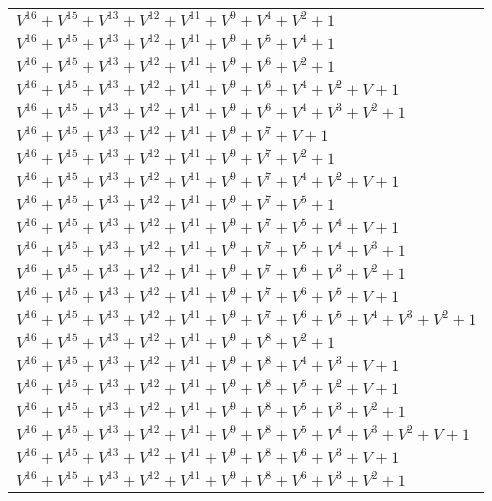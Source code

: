 \documentclass[12pt]{article}
\begin{document}
\begin{adjustwidth}{-4cm}{}
\begin{center}
\begin{longtable}{|l|}
$V^{16}  +V^{15}  +V^{13}  +V^{12}  +V^{11}  +V^{9}  +V^{4}  +V^{2}  + 1$ \\
$V^{16}  +V^{15}  +V^{13}  +V^{12}  +V^{11}  +V^{9}  +V^{5}  +V^{4}  + 1$ \\
$V^{16}  +V^{15}  +V^{13}  +V^{12}  +V^{11}  +V^{9}  +V^{6}  +V^{2}  + 1$ \\
$V^{16}  +V^{15}  +V^{13}  +V^{12}  +V^{11}  +V^{9}  +V^{6}  +V^{4}  +V^{2}  + V + 1$ \\
$V^{16}  +V^{15}  +V^{13}  +V^{12}  +V^{11}  +V^{9}  +V^{6}  +V^{4}  +V^{3}  +V^{2}  + 1$ \\
$V^{16}  +V^{15}  +V^{13}  +V^{12}  +V^{11}  +V^{9}  +V^{7}  + V + 1$ \\
$V^{16}  +V^{15}  +V^{13}  +V^{12}  +V^{11}  +V^{9}  +V^{7}  +V^{2}  + 1$ \\
$V^{16}  +V^{15}  +V^{13}  +V^{12}  +V^{11}  +V^{9}  +V^{7}  +V^{4}  +V^{2}  + V + 1$ \\
$V^{16}  +V^{15}  +V^{13}  +V^{12}  +V^{11}  +V^{9}  +V^{7}  +V^{5}  + 1$ \\
$V^{16}  +V^{15}  +V^{13}  +V^{12}  +V^{11}  +V^{9}  +V^{7}  +V^{5}  +V^{4}  + V + 1$ \\
$V^{16}  +V^{15}  +V^{13}  +V^{12}  +V^{11}  +V^{9}  +V^{7}  +V^{5}  +V^{4}  +V^{3}  + 1$ \\
$V^{16}  +V^{15}  +V^{13}  +V^{12}  +V^{11}  +V^{9}  +V^{7}  +V^{6}  +V^{3}  +V^{2}  + 1$ \\
$V^{16}  +V^{15}  +V^{13}  +V^{12}  +V^{11}  +V^{9}  +V^{7}  +V^{6}  +V^{5}  + V + 1$ \\
$V^{16}  +V^{15}  +V^{13}  +V^{12}  +V^{11}  +V^{9}  +V^{7}  +V^{6}  +V^{5}  +V^{4}  +V^{3}  +V^{2}  + 1$ \\
$V^{16}  +V^{15}  +V^{13}  +V^{12}  +V^{11}  +V^{9}  +V^{8}  +V^{2}  + 1$ \\
$V^{16}  +V^{15}  +V^{13}  +V^{12}  +V^{11}  +V^{9}  +V^{8}  +V^{4}  +V^{3}  + V + 1$ \\
$V^{16}  +V^{15}  +V^{13}  +V^{12}  +V^{11}  +V^{9}  +V^{8}  +V^{5}  +V^{2}  + V + 1$ \\
$V^{16}  +V^{15}  +V^{13}  +V^{12}  +V^{11}  +V^{9}  +V^{8}  +V^{5}  +V^{3}  +V^{2}  + 1$ \\
$V^{16}  +V^{15}  +V^{13}  +V^{12}  +V^{11}  +V^{9}  +V^{8}  +V^{5}  +V^{4}  +V^{3}  +V^{2}  + V + 1$ \\
$V^{16}  +V^{15}  +V^{13}  +V^{12}  +V^{11}  +V^{9}  +V^{8}  +V^{6}  +V^{3}  + V + 1$ \\
$V^{16}  +V^{15}  +V^{13}  +V^{12}  +V^{11}  +V^{9}  +V^{8}  +V^{6}  +V^{3}  +V^{2}  + 1$ \\

\end{longtable}
\end{center}
\end{adjustwidth}
\end{document}
